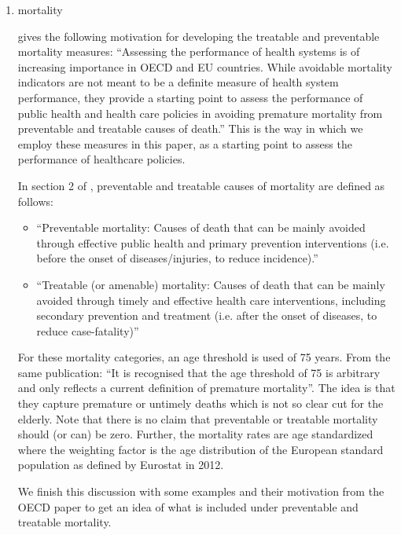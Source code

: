 \documentclass[a4paper,12pt]{article}
\begin{document}
\begin{enumerate}
\item mortality
\label{sec:org3110a8e}
\label{sec:mortality}

\cite{OECD_avoidable_mortality} gives the following motivation for developing the treatable and preventable mortality measures: ``Assessing the performance of health systems is of increasing importance in OECD and EU countries. While avoidable mortality indicators are not meant to be a definite measure of health system performance, they provide a starting point to assess the performance of public health and health care policies in avoiding premature mortality from preventable and treatable causes of death.'' This is the way in which we employ these measures in this paper, as a starting point to assess the performance of healthcare policies. 

In section 2 of \cite{OECD_avoidable_mortality}, preventable and treatable causes of mortality are defined as follows:
\begin{itemize}
\item ``Preventable mortality: Causes of death that can be mainly avoided through effective public health and primary prevention interventions (i.e. before the onset of diseases/injuries, to reduce incidence).''
\item ``Treatable (or amenable) mortality: Causes of death that can be mainly avoided through timely and effective health care interventions, including secondary prevention and treatment (i.e. after the onset of diseases, to reduce case-fatality)''
\end{itemize}

For these mortality categories, an age threshold is used of 75 years. From the same publication: ``It is recognised that the age threshold of 75 is arbitrary and only reflects a current definition of premature mortality''. The idea is that they capture premature or untimely deaths which is not so clear cut for the elderly. Note that there is no claim that preventable or treatable mortality should (or can) be zero. Further, the mortality rates are age standardized where the weighting factor is the age distribution of the European standard population as defined by Eurostat in 2012.

We finish this discussion with some examples and their motivation from the OECD paper to get an idea of what is included under preventable and treatable mortality.


\end{enumerate}
\end{document}

